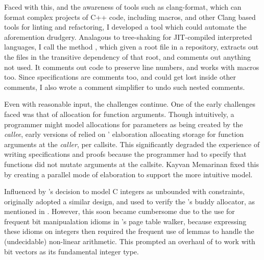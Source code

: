 Faced with this, and the awareness of tools such as clang-format, which can
format complex projects of C++ code, including macros, and other Clang based
tools for linting and refactoring, I developed a tool which could automate the
aforemention drudgery. Analagous to tree-shaking for JIT-compiled interpreted
languages, I call the method , which given a root file in a
repository, extracts out the files in the transitive dependency of that root,
and comments out anything not used. It comments out code to preserve line numbers,
and works with macros too. Since  specifications are comments too, and
could get lost inside other comments, I also wrote a comment simplifier to undo
such nested comments.

Even with reasonable input, the challenges continue. One of the early
challenges  faced was that of allocation for function arguments. Though
intuitively, a programmer might model allocations for parameters as being
created by the \emph{callee}, early versions of  relied on
' elaboration allocating storage for function arguments at the
\emph{caller}, per callsite. This significantly degraded the experience of
writing specifications and proofs because the programmer had to specify that
functions did not mutate arguments at the callsite. Kayvan Memarinan fixed this
by creating a parallel mode of elaboration to support the more intuitive model.

Influenced by 's decision to model C integers as unbounded with
constraints,  originally adopted a similar design, and used to verify
the 's buddy allocator, as mentioned in .
However, this soon became cumbersome due to the use for frequent bit
manipualation idioms in 's page table walker, because expressing these
idioms on integers then required the frequent use of lemmas to handle the
(undecidable) non-linear arithmetic. This prompted an overhaul of  to
work with bit vectors as its fundamental integer type.

